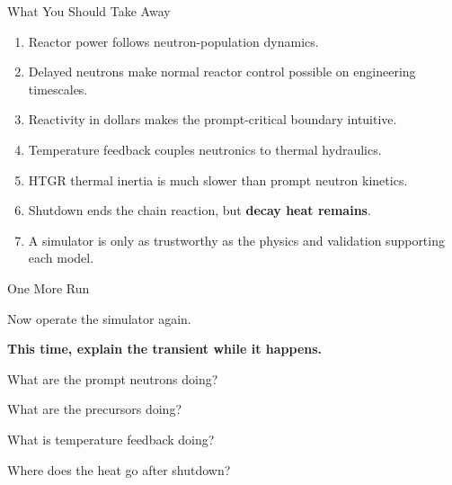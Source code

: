 \documentclass[aspectratio=169]{beamer}
\begin{document}
\begin{frame}{What You Should Take Away}

    \begin{enumerate}

        \item Reactor power follows neutron-population dynamics.

        \item Delayed neutrons make normal reactor control possible on
              engineering timescales.

        \item Reactivity in dollars makes the prompt-critical boundary
              intuitive.

        \item Temperature feedback couples neutronics to thermal hydraulics.

        \item HTGR thermal inertia is much slower than prompt neutron kinetics.

        \item Shutdown ends the chain reaction, but
              \textbf{decay heat remains}.

        \item A simulator is only as trustworthy as the physics and validation
              supporting each model.

    \end{enumerate}

\end{frame}



\begin{frame}{One More Run}

    \centering

    \Large

    Now operate the simulator again.

    \vspace{1.5em}

    \textbf{
        This time, explain the transient while it happens.
    }

    \vspace{1.5em}

    \normalsize

    What are the prompt neutrons doing?

    \vspace{0.5em}

    What are the precursors doing?

    \vspace{0.5em}

    What is temperature feedback doing?

    \vspace{0.5em}

    Where does the heat go after shutdown?

\end{frame}
\end{document}
